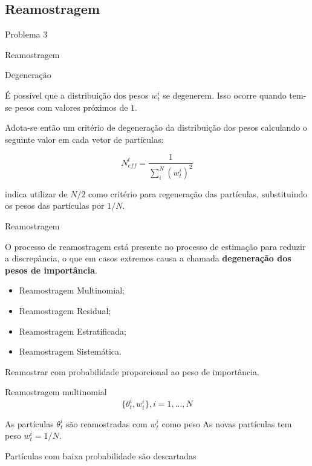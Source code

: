 \documentclass{beamer}
\begin{document}
\subsection{Reamostragem}

\begin{frame}{Problema 3}
    \begin{block}{}
      \Huge  Reamostragem
    \end{block}
\end{frame}


\begin{frame}{Degeneração}

É possível que a distribuição dos pesos $w^i_t$ se degenerem. Isso ocorre quando tem-se pesos com valores próximos de $1$.

\vspace{0.5cm} 
\pause

Adota-se então um critério de degeneração da distribuição dos pesos calculando o seguinte valor em cada vetor de partículas:

$$
N^t_{eff} = \frac{1}{\sum^N_ i{(w_t^{i})^2}}
$$


\pause

\cite{petris} indica utilizar de $N/2$ como critério para regeneração das partículas, substituindo os pesos das partículas por $1/N$.

\end{frame}


\begin{frame}{Reamostragem}

O processo de reamostragem está presente no processo de estimação para reduzir a discrepância, o que em casos extremos causa a chamada \textbf{degeneração dos pesos de importância}. 

\pause

\begin{itemize}
\item Reamostragem Multinomial;
\item Reamostragem Residual;
\item Reamostragem Estratificada;
\item Reamostragem Sistemática.
\end{itemize}

\pause

Reamostrar com probabilidade proporcional ao peso de importância.

\end{frame}


\begin{frame}{Reamostragem multinomial}
$$
\{\theta_t^i,w_t^i\},  i=1,...,N
$$

\pause
\vspace{0.5cm} 
As partículas $\theta^i_t$ são reamostradas com $w^i_t$ como peso
\pause
\vspace{0.5cm} 
As novas partículas tem peso $w^i_t = 1/N$. 
\vspace{0.5cm} 

\pause
Partículas com baixa probabilidade são descartadas

\end{frame}
\end{document}

